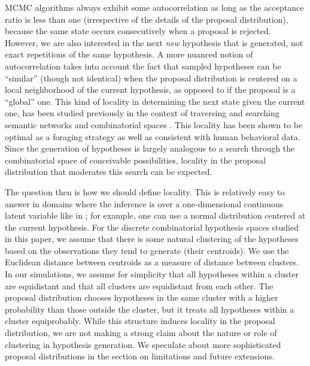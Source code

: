 MCMC algorithms always exhibit some autocorrelation 
as long as the acceptance ratio is less than one (irrespective of the details of the proposal distribution), because the same state occurs consecutively when a proposal is rejected.
However, we are also interested in the next \textit{new} hypothesis that is generated, not exact repetitions of the same hypothesis. A more nuanced notion of autocorrelation takes into account the fact that sampled hypotheses can be ``similar'' (though not identical) when the proposal distribution is centered on a local neighborhood of the current hypothesis, as opposed to if the proposal is a ``global'' one. This kind of locality in determining the next state given the current one, has been studied previously in the context of traversing and searching semantic networks \citep{abbott2015random} and combinatorial spaces \citep{smith2013multiply}. This locality has been shown to be optimal as a foraging strategy \citep{hills2012optimal} as well as consistent with human behavioral data. Since the generation of hypotheses is largely analogous to a search through the combinatorial space of conceivable possibilities, locality in the proposal distribution that moderates this search can be expected.

The question then is how we should define locality. This is relatively easy to answer in domains where the inference is over a one-dimensional continuous latent variable like in \cite{Lieder2013}; for example, one can use a normal distribution centered at the current hypothesis. For the discrete combinatorial hypothesis spaces studied in this paper, we assume that there is some natural clustering of the hypotheses based on the observations they tend to generate (their centroids). We use the Euclidean distance between centroids as a measure of distance between clusters. In our simulations, we assume for simplicity that all hypotheses within a cluster are equidistant and that all clusters are equidistant from each other. The proposal distribution chooses hypotheses in the same cluster with a higher probability than those outside the cluster, but it treats all hypotheses within a cluster equiprobably. While this structure induces locality in the proposal distribution, we are not making a strong claim about the nature or role of clustering in hypothesis generation. We speculate about more sophisticated proposal distributions in the section on limitations and future extensions. 


